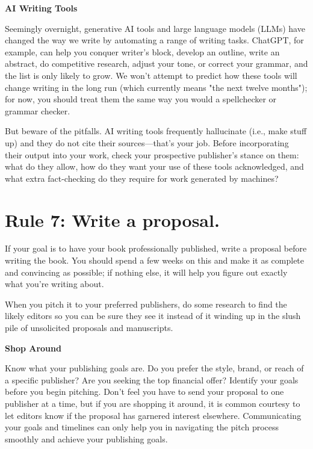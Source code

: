 \documentclass[10pt,letterpaper]{article}
\begin{document}
\begin{mdframed}
\textbf{AI Writing Tools}

\noindent
Seemingly overnight,
generative AI tools and large language models (LLMs) have changed the way we write
by automating a range of writing tasks.
ChatGPT, for example, can help you conquer writer's block, develop an outline,
write an abstract, do competitive research, adjust your tone, or correct your grammar,
and the list is only likely to grow.
We won't attempt to predict how these tools will change writing in the long run
(which currently means "the next twelve months");
for now, you should treat them the same way you would a spellchecker or grammar checker.

But beware of the pitfalls.
AI writing tools frequently hallucinate (i.e., make stuff up)
and they do not cite their sources---that's your job.
Before incorporating their output into your work,
check your prospective publisher's stance on them:
what do they allow,
how do they want your use of these tools acknowledged,
and what extra fact-checking do they require for work generated by machines?
\end{mdframed}

\section*{Rule 7: Write a proposal.}

If your goal is to have your book professionally published, write a
proposal before writing the book. You should spend a few weeks on this
and make it as complete and convincing as possible; if nothing else, it
will help you figure out exactly what you're writing about.

When you pitch it to your preferred publishers, do some research to find
the likely editors so you can be sure they see it instead of it winding
up in the slush pile of unsolicited proposals and manuscripts.

\begin{mdframed}
\textbf{Shop Around}

\noindent
Know what your publishing goals are. Do you prefer the style, brand, or
reach of a specific publisher? Are you seeking the top financial offer?
Identify your goals before you begin pitching. Don't feel you have to
send your proposal to one publisher at a time, but if you are shopping
it around, it is common courtesy to let editors know if the proposal has
garnered interest elsewhere. Communicating your goals and timelines can
only help you in navigating the pitch process smoothly and achieve your
publishing goals.
\end{mdframed}
\end{document}
